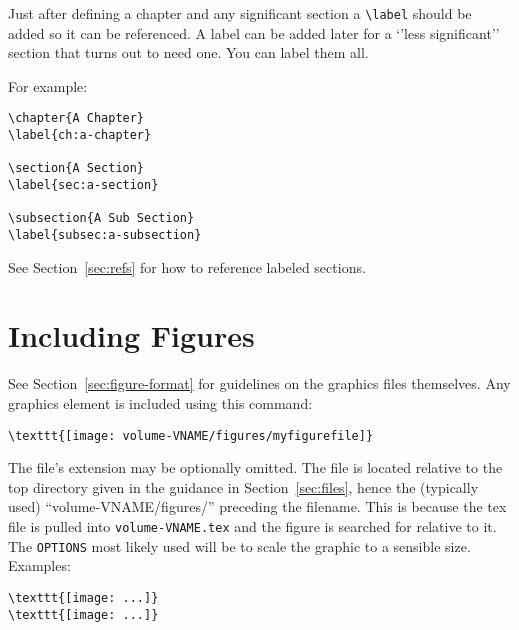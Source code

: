Just after defining a chapter and any significant section a
\verb|\label| should be added so it can be referenced. A label can be added later
for a `'less significant'' section that turns out to need one. You can label them all. 

For example:

\begin{verbatim}
\chapter{A Chapter}
\label{ch:a-chapter}

\section{A Section}
\label{sec:a-section}

\subsection{A Sub Section}
\label{subsec:a-subsection}
\end{verbatim}

See Section~\ref{sec:refs} for how to reference labeled sections.

\section{Including Figures}
\label{sec:figures}

See Section~\ref{sec:figure-format} for guidelines on the graphics files themselves.
Any graphics element is included using this command:

\begin{verbatim}
\texttt{[image: volume-VNAME/figures/myfigurefile]}
\end{verbatim}

The file's extension may be optionally omitted.
The file is located relative to the top directory given in the guidance in Section~\ref{sec:files}, hence the (typically used) ``volume-VNAME/figures/'' preceding the filename.  This is because the tex file is pulled into \texttt{volume-VNAME.tex} and the figure is searched for relative to it.
The \texttt{OPTIONS} most likely used will be to scale the graphic to
a sensible size.  Examples:

\begin{verbatim}
\texttt{[image: ...]}
\texttt{[image: ...]}
\end{verbatim}

